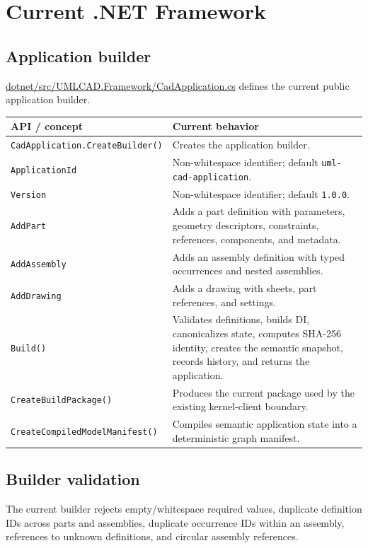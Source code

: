 \documentclass[11pt,a4paper]{report}
\newcommand{\pathref}[1]{\url{#1}}
\begin{document}
\chapter{Current .NET Framework}

\section{Application builder}
\pathref{dotnet/src/UMLCAD.Framework/CadApplication.cs} defines the current public application builder.

\begin{tabularx}{\textwidth}{@{}p{}X@{}}
\toprule
API / concept & Current behavior \\
\midrule
\texttt{CadApplication.CreateBuilder()} & Creates the application builder. \\
\texttt{ApplicationId} & Non-whitespace identifier; default \texttt{uml-cad-application}. \\
\texttt{Version} & Non-whitespace identifier; default \texttt{1.0.0}. \\
\texttt{AddPart} & Adds a part definition with parameters, geometry descriptors, constraints, references, components, and metadata. \\
\texttt{AddAssembly} & Adds an assembly definition with typed occurrences and nested assemblies. \\
\texttt{AddDrawing} & Adds a drawing with sheets, part references, and settings. \\
\texttt{Build()} & Validates definitions, builds DI, canonicalizes state, computes SHA-256 identity, creates the semantic snapshot, records history, and returns the application. \\
\texttt{CreateBuildPackage()} & Produces the current package used by the existing kernel-client boundary. \\
\texttt{CreateCompiledModelManifest()} & Compiles semantic application state into a deterministic graph manifest. \\
\bottomrule
\end{tabularx}

\section{Builder validation}
The current builder rejects empty/whitespace required values, duplicate definition IDs across parts and assemblies, duplicate occurrence IDs within an assembly, references to unknown definitions, and circular assembly references.
\end{document}
